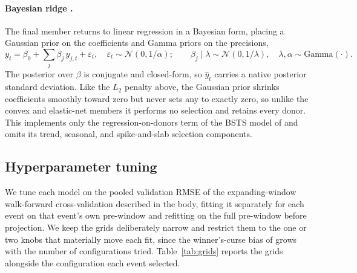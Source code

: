 \paragraph{Bayesian ridge \citep{brodersen2015}.} The final member returns to linear regression
in a Bayesian form, placing a Gaussian prior on the coefficients and Gamma priors on the
precisions,
\begin{equation}
y_t = \beta_0 + \sum_j \beta_j\, y_{j,t} + \varepsilon_t,\quad
\varepsilon_t\sim\mathcal{N}(0,1/\alpha);\qquad
\beta_j\mid\lambda \sim \mathcal{N}(0,1/\lambda),\quad \lambda,\alpha\sim\text{Gamma}(\cdot).
\label{eq:bridge}
\end{equation}
The posterior over $\beta$ is conjugate and closed-form, so $\hat y_t$ carries a native
posterior standard deviation. Like the $L_2$ penalty above, the Gaussian prior shrinks
coefficients smoothly toward zero but never sets any to exactly zero, so unlike the convex and
elastic-net members it performs no selection and retains every donor. This implements only the regression-on-donors term of the
BSTS model of \citet{brodersen2015} and omits its trend, seasonal, and spike-and-slab selection
components.

\subsection{Hyperparameter tuning}\label{app:grids}
We tune each model on the pooled validation RMSE of the expanding-window walk-forward
cross-validation described in the body, fitting it separately for each event on that event's own
pre-window and refitting on the full pre-window before projection. We keep the grids deliberately
narrow and restrict them to the one or two knobs that materially move each fit, since the
winner's-curse bias of \citet{cawley2010} grows with the number of configurations tried.
Table~\ref{tab:grids} reports the grids alongside the configuration each event selected.

